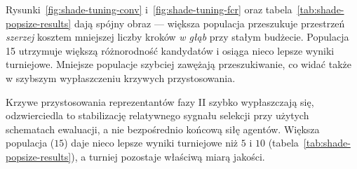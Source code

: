 Rysunki~\ref{fig:shade-tuning-conv} i~\ref{fig:shade-tuning-fcr} oraz tabela~\ref{tab:shade-popsize-results} dają spójny obraz --- większa populacja przeszukuje przestrzeń \emph{szerzej} kosztem mniejszej liczby kroków \emph{w głąb} przy stałym budżecie. Populacja 15 utrzymuje większą różnorodność kandydatów i osiąga nieco lepsze wyniki turniejowe. Mniejsze populacje szybciej zawężają przeszukiwanie, co widać także w szybszym wypłaszczeniu krzywych przystosowania.

Krzywe przystosowania reprezentantów fazy II szybko wypłaszczają się, odzwierciedla to stabilizację relatywnego sygnału selekcji przy użytych schematach ewaluacji, a nie bezpośrednio końcową siłę agentów. Większa populacja (\(15\)) daje nieco lepsze wyniki turniejowe niż \(5\) i \(10\) (tabela~\ref{tab:shade-popsize-results}), a turniej pozostaje właściwą miarą jakości.


















